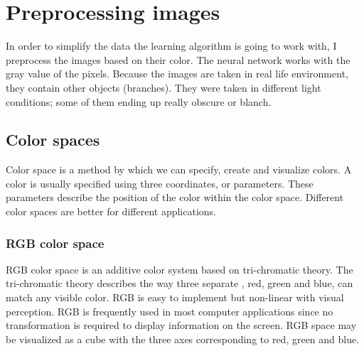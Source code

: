 \chapter{Preprocessing images}\label{ch:PREPROC}

In order to simplify the data the learning algorithm is going to work with, I preprocess the images based on their color. The neural network works with the gray value of the pixels. Because the images are taken in real life environment, they contain other objects (branches). They were taken in different light conditions; some of them ending up really obscure or blanch. 

\section{Color spaces}\label{sec:PREPROC:colorSpaces}

Color space is a method by which we can specify, create and visualize colors. A color is usually specified using three coordinates, or parameters. These parameters describe the position of the color within the color space. Different color spaces are better for different applications. 

\subsection{RGB color space}\label{sec:PREPROC:rgb}

RGB color space is an additive color system based on tri-chromatic theory. The tri-chromatic theory describes the way three separate %
, red, green and blue, can match any visible color. RGB is easy to implement but non-linear with visual perception. RGB is frequently used in most computer applications since no transformation is required to display information on the screen. RGB space may be visualized as a cube with the three axes corresponding to red, green and blue.

